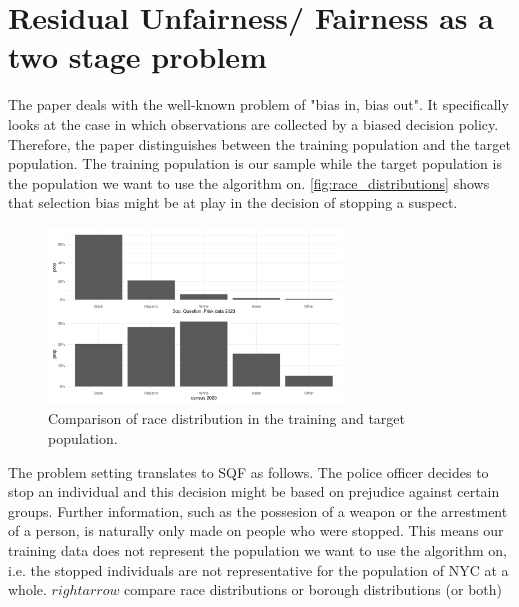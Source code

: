 \section*{Residual Unfairness/ Fairness as a two stage problem}
The paper deals with the well-known problem of "bias in, bias out". It specifically looks at the case in which observations are collected by a biased decision policy. Therefore, the paper distinguishes between the training population and the target population. The training population is our sample while the target population is the population we want to use the algorithm on. 
\autoref{fig:race_distributions} shows that selection bias might be at play in the decision of stopping a suspect.
\begin{figure}
    \centering
    \includegraphics[width=0.7\textwidth]{../figures/sqf_case_study_plot6.png}
    \caption{Comparison of race distribution in the training and target population.}
    \label{fig:race_distributions}
\end{figure}


The problem setting translates to SQF as follows. The police officer decides to stop an individual and this decision might be based on prejudice against certain groups. Further information, such as the possesion of a weapon or the arrestment of a person, is naturally only made on people who were stopped.
This means our training data does not represent the population we want to use the algorithm on, i.e. the stopped individuals are not representative for the population of NYC at a whole. $rightarrow$ compare race distributions or borough distributions (or both)


